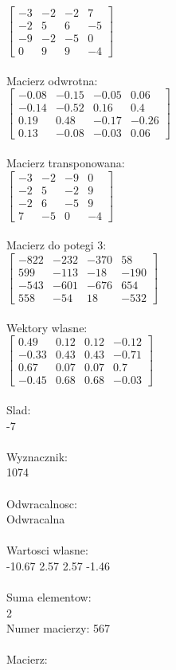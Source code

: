 \documentclass[a4paper,12pt]{article}
\begin{document}
$\begin{bmatrix} -3&-2&-2&7\\-2&5&6&-5\\-9&-2&-5&0\\0&9&9&-4 \end{bmatrix}$
\\
\\
Macierz odwrotna:\\

$\begin{bmatrix} -0.08&-0.15&-0.05&0.06\\-0.14&-0.52&0.16&0.4\\0.19&0.48&-0.17&-0.26\\0.13&-0.08&-0.03&0.06 \end{bmatrix}$
\\
\\
Macierz transponowana:\\

$\begin{bmatrix} -3&-2&-9&0\\-2&5&-2&9\\-2&6&-5&9\\7&-5&0&-4 \end{bmatrix}$
\\
\\
Macierz do potegi 3:\\

$\begin{bmatrix} -822&-232&-370&58\\599&-113&-18&-190\\-543&-601&-676&654\\558&-54&18&-532 \end{bmatrix}$
\\
\\
Wektory wlasne:\\

$\begin{bmatrix} 0.49&0.12&0.12&-0.12\\-0.33&0.43&0.43&-0.71\\0.67&0.07&0.07&0.7\\-0.45&0.68&0.68&-0.03 \end{bmatrix}$
\\
\\
Slad:\\
-7
\\
\\
Wyznacznik:\\
1074
\\
\\
Odwracalnosc:\\
Odwracalna
\\
\\
Wartosci wlasne:\\
-10.67 2.57 2.57 -1.46
\\
\\
Suma elementow:\\
2
\\
\newpage
Numer macierzy:
567
\\
\\
Macierz:\\
\end{document}
